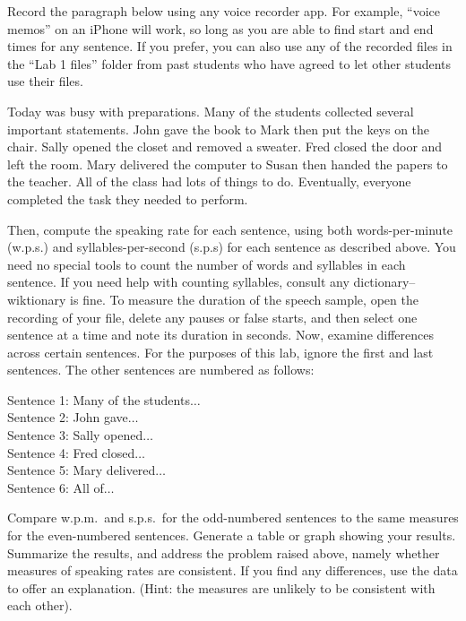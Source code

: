 \documentclass[lab=1,title={Speaking rate},turnin=false]{com310lab}
\begin{document}
\begin{task}
	Record the paragraph below using any voice recorder app.
	For example, ``voice memos'' on an iPhone will work, so long as you are able to find start and end times for any sentence.
	If you prefer, you can also use any of the recorded files in the ``Lab 1 files'' folder from past students who have agreed to let other students use their files.
	\begin{displayquote}
		Today was busy with preparations.
		Many of the students collected several important statements.
		John gave the book to Mark then put the keys on the chair.
		Sally opened the closet and removed a sweater.
		Fred closed the door and left the room.
		Mary delivered the computer to Susan then handed the papers to the teacher.
		All of the class had lots of things to do.
		Eventually, everyone completed the task they needed to perform.
	\end{displayquote}
	Then, compute the speaking rate for each sentence, using both words-per-minute (w.p.s.) and syllables-per-second (s.p.s) for each sentence as described above.
	You need no special tools to count the number of words and syllables in each sentence.
	If you need help with counting syllables, consult any dictionary--wiktionary is fine.
	To measure the duration of the speech sample, open the recording of your file, delete any pauses or false starts, and then select one sentence at a time and note its duration in seconds.
	Now, examine differences across certain sentences.
	For the purposes of this lab, ignore the first and last sentences.
	The other sentences are numbered as follows:
	\begin{displayquote}
		Sentence 1: Many of the students$\dots$\\
		Sentence 2: John gave$\dots$\\
		Sentence 3: Sally opened$\dots$\\
		Sentence 4: Fred closed$\dots$\\
		Sentence 5: Mary delivered$\dots$\\
		Sentence 6: All of$\dots$\\
	\end{displayquote}
	Compare w.p.m.\ and s.p.s.\ for the odd-numbered sentences to the same measures for the even-numbered sentences.
	Generate a table or graph showing your results.
	Summarize the results, and address the problem raised above, namely whether measures of speaking rates are consistent.
	If you find any differences, use the data to offer an explanation.
	(Hint: the measures are unlikely to be consistent with each other).
\end{task}
\end{document}
